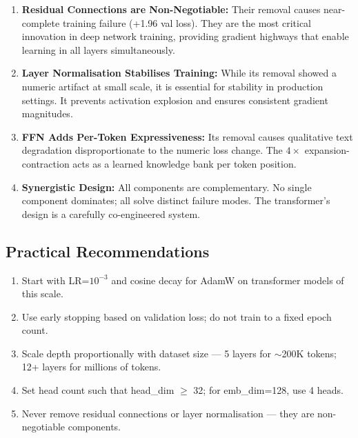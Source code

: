 \documentclass[12pt,a4paper]{article}
\begin{document}
\begin{enumerate}[leftmargin=2cm]
  \item \textbf{Residual Connections are Non-Negotiable:} Their removal causes near-complete training failure (+1.96 val loss). They are the most critical innovation in deep network training, providing gradient highways that enable learning in all layers simultaneously.

  \item \textbf{Layer Normalisation Stabilises Training:} While its removal showed a numeric artifact at small scale, it is essential for stability in production settings. It prevents activation explosion and ensures consistent gradient magnitudes.

  \item \textbf{FFN Adds Per-Token Expressiveness:} Its removal causes qualitative text degradation disproportionate to the numeric loss change. The $4\times$ expansion-contraction acts as a learned knowledge bank per token position.

  \item \textbf{Synergistic Design:} All components are complementary. No single component dominates; all solve distinct failure modes. The transformer's design is a carefully co-engineered system.
\end{enumerate}

\subsection{Practical Recommendations}

\begin{enumerate}[leftmargin=2cm]
  \item Start with LR=$10^{-3}$ and cosine decay for AdamW on transformer models of this scale.
  \item Use early stopping based on validation loss; do not train to a fixed epoch count.
  \item Scale depth proportionally with dataset size — 5 layers for $\sim$200K tokens; 12+ layers for millions of tokens.
  \item Set head count such that head\_dim $\geq$ 32; for emb\_dim=128, use 4 heads.
  \item Never remove residual connections or layer normalisation — they are non-negotiable components.
\end{enumerate}

\newpage
\end{document}
